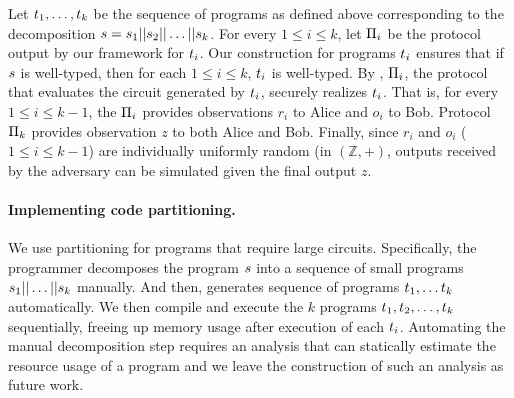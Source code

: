  Let $t_1, \ldots, t_k$ be the
sequence of programs as defined above corresponding to the
decomposition $s = s_1||s_2||\ldots||s_k$.  For every
$1\leq i\leq k$, let $\Pi_i$ be the \mpc protocol output by our
framework for $t_i$. Our construction for programs $t_i$
ensures that if $s$ is well-typed, then for each $1\leq i \leq k$,
$t_i$ is well-typed. By , $\Pi_i$,
the \mpc protocol that evaluates the circuit generated by $t_i$,
securely realizes $t_i$. That is, for every $1\leq i \leq k-1$,
the $\Pi_i$ provides observations $r_i$ to Alice and $o_i$
to Bob. Protocol $\Pi_k$ provides observation $z$ to both Alice
and Bob. Finally, since $r_i$ and $o_i$ ($1\leq i\leq k-1$) are
individually uniformly random (in $(\mathbb{Z},+)$, outputs received
by the adversary can be simulated given the final output $z$.


%
\vspace{-0.1in}
\paragraph{Implementing code partitioning.}
We use partitioning for programs that require large
circuits. Specifically, the programmer decomposes the program
$s$ into a sequence of small programs
$s_1||\dots||s_k$ manually. And then, \tool generates
sequence of programs $t_1,\dots t_k$ automatically. We then
compile and execute the $k$ programs
$t_1,t_2,\ldots,t_k$ sequentially, freeing up memory
usage after execution of each $t_i$.
Automating the manual decomposition step requires an analysis that can 
statically estimate the resource usage of a \tool program and we leave
the construction of such an analysis as future work.%
